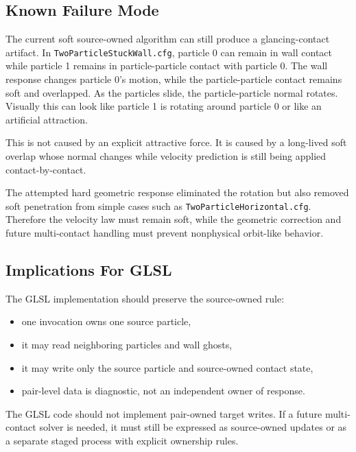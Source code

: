 \subsection{Known Failure Mode}

The current soft source-owned algorithm can still produce a glancing-contact
artifact.  In \texttt{TwoParticleStuckWall.cfg}, particle 0 can remain in wall
contact while particle 1 remains in particle-particle contact with particle 0.
The wall response changes particle 0's motion, while the particle-particle
contact remains soft and overlapped.  As the particles slide, the
particle-particle normal rotates.  Visually this can look like particle 1 is
rotating around particle 0 or like an artificial attraction.

This is not caused by an explicit attractive force.  It is caused by a
long-lived soft overlap whose normal changes while velocity prediction is still
being applied contact-by-contact.

The attempted hard geometric response eliminated the rotation but also removed
soft penetration from simple cases such as \texttt{TwoParticleHorizontal.cfg}.
Therefore the velocity law must remain soft, while the geometric correction and
future multi-contact handling must prevent nonphysical orbit-like behavior.

\subsection{Implications For GLSL}

The GLSL implementation should preserve the source-owned rule:
\begin{itemize}
    \item one invocation owns one source particle,
    \item it may read neighboring particles and wall ghosts,
    \item it may write only the source particle and source-owned contact state,
    \item pair-level data is diagnostic, not an independent owner of response.
\end{itemize}

The GLSL code should not implement pair-owned target writes.  If a future
multi-contact solver is needed, it must still be expressed as source-owned
updates or as a separate staged process with explicit ownership rules.

